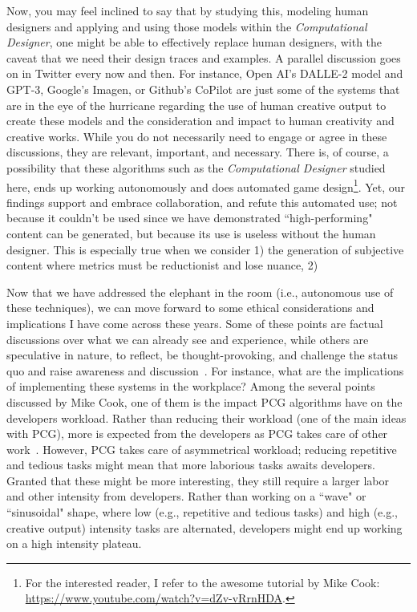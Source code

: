 Now, you may feel inclined to say that by studying this, modeling human designers and applying and using those models within the \emph{Computational Designer}, one might be able to effectively replace human designers, with the caveat that we need their design traces and examples. A parallel discussion goes on in Twitter every now and then. For instance, Open AI's DALLE-2 model and GPT-3, Google's Imagen, or Github's CoPilot are just some of the systems that are in the eye of the hurricane regarding the use of human creative output to create these models and the consideration and impact to human creativity and creative works. While you do not necessarily need to engage or agree in these discussions, they are relevant, important, and necessary. There is, of course, a possibility that these algorithms such as the \emph{Computational Designer} studied here, ends up working autonomously and does automated game design\footnote{For the interested reader, I refer to the awesome tutorial by Mike Cook: \url{https://www.youtube.com/watch?v=dZv-vRrnHDA}.}. Yet, our findings support and embrace collaboration, and refute this automated use; not because it couldn't be used since we have demonstrated ``high-performing" content can be generated, but because its use is useless without the human designer. This is especially true when we consider 1) the generation of subjective content where metrics must be reductionist and lose nuance, 2) 

Now that we have addressed the elephant in the room (i.e., autonomous use of these techniques), we can move forward to some ethical considerations and implications I have come across these years. Some of these points are factual discussions over what we can already see and experience, while others are speculative in nature, to reflect, be thought-provoking, and challenge the status quo and raise awareness and discussion~\cite{fiesler_innovating_2021,klassen_run_2022}. For instance, what are the implications of implementing these systems in the workplace? Among the several points discussed by Mike Cook, one of them is the impact PCG algorithms have on the developers workload. Rather than reducing their workload (one of the main ideas with PCG), more is expected from the developers as PCG takes care of other work~\cite{cook_social_2021}. However, PCG takes care of asymmetrical workload; reducing repetitive and tedious tasks might mean that more laborious tasks awaits developers. Granted that these might be more interesting, they still require a larger labor and other intensity from developers. Rather than working on a ``wave" or ``sinusoidal" shape, where low (e.g., repetitive and tedious tasks) and high (e.g., creative output) intensity tasks are alternated, developers might end up working on a high intensity plateau.

